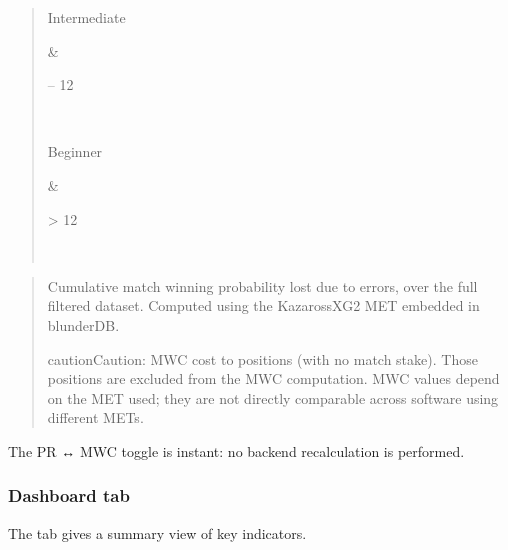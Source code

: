 \documentclass[letterpaper,10pt,english]{sphinxmanual}
\begin{document}
\begin{quote}
\begin{savenotes}
\begin{tabular}[t]{}
\begin{varwidth}[t]{}
\sphinxAtStartPar
Intermediate
\sphinxbeforeendvarwidth
\end{varwidth}%
&\begin{varwidth}[t]{}
 – 12
\sphinxbeforeendvarwidth
\end{varwidth}%
\\
\sphinxhline\begin{varwidth}[t]{}
\sphinxAtStartPar
Beginner
\sphinxbeforeendvarwidth
\end{varwidth}%
&\begin{varwidth}[t]{}
\sphinxAtStartPar
> 12
\sphinxbeforeendvarwidth
\end{varwidth}%
\\
\sphinxbottomrule
\end{tabular}
\sphinxtableafterendhook\par
\sphinxattableend\end{savenotes}
\end{quote}

\sphinxAtStartPar
{}
\begin{quote}

\sphinxAtStartPar
Cumulative match winning probability lost due to errors, over the full filtered dataset. Computed using the Kazaross\sphinxhyphen{}XG2 MET embedded in blunderDB.

\begin{sphinxadmonition}{caution}{Caution:}
\sphinxAtStartPar
MWC cost  to  positions (with no match stake). Those positions are excluded from the MWC computation. MWC values depend on the MET used; they are not directly comparable across software using different METs.
\end{sphinxadmonition}
\end{quote}

\sphinxAtStartPar
The PR ↔ MWC toggle is instant: no backend recalculation is performed.


\subsubsection{Dashboard tab}
\label{\detokenize{manuel:onglet-dashboard}}
\sphinxAtStartPar
The  tab gives a summary view of key indicators.
\end{document}
